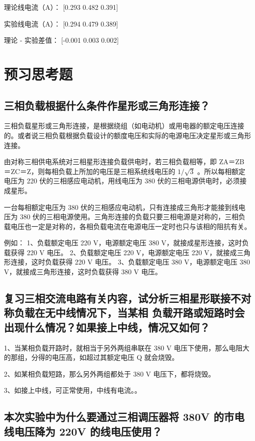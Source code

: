 \documentclass{article}
\begin{document}
理论线电流（A）： [0.293 0.482 0.391]

实验线电流（A）： [0.294 0.479 0.389]

理论 - 实验差值： [-0.001  0.003  0.002]



\section{预习思考题 }
\subsection{ 三相负载根据什么条件作星形或三角形连接？}

三相负载星形或三角形连接，是根据绕组（如电动机）或用电器的额定电压连接的。或者说三相负载根据负载设计的额度电压和实际的电源电压决定星形或三角形连接。

由对称三相供电系统对三相星形连接负载供电时，若三相负载相等，即 ZA＝ZB＝ZC＝Z，则每相负载上所加的电压是三相系统线电压的 $1 / \sqrt{3}$ 。所以每相额定电压为 220 伏的三相感应电动机，用线电压为 380 伏的三相电源供电时，必须接成星形。

一台每相额定电压为 380 伏的三相感应电动机，只有连接成三角形才能接到线电压为 380 伏的三相电源使用。三角形连接的负载只要三相电源是对称的，三相负载电压也一定是对称的，各相负载电流在电源电压一定时也只与该相的阻抗有关。

例如：
1、负载额定电压 220 V，电源额定电压 380 V，就接成星形连接，这时负载获得 220 V 电压。
2、负载额定电压 220 V，电源额定电压 220 V，就接成三角形连接，这时负载获得 220 V 电压。
3、负载额定电压 380 V，电源额定电压 380 V，就接成三角形连接，这时负载获得 380 V 电压。


\subsection{ 复习三相交流电路有关内容，试分析三相星形联接不对称负载在无中线情况下，当某相
负载开路或短路时会出现什么情况？如果接上中线，情况又如何？}

1、当某相负载开路时，就相当于另外两组串联在 380 V 电压下使用，那么电阻大的那组，分得的电压高，如超过其额定电压 Q 就会烧毁。

2、如某相负载短路，那么另外两组都处于 380 V 电压下，都将烧毁。

3、如接上中线，可正常使用，中线有电流。。

\subsection{本次实验中为什么要通过三相调压器将 380V 的市电线电压降为 220V 的线电压使用？ }
\end{document}
